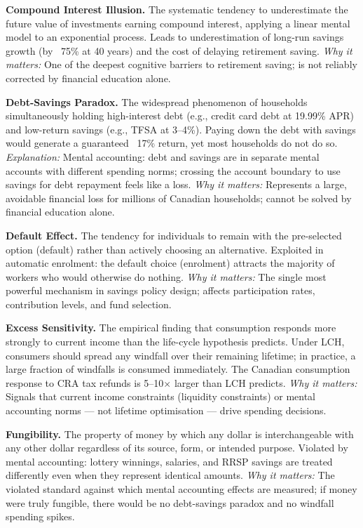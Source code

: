 \documentclass[12pt, letterpaper]{article}
\begin{document}
\textbf{Compound Interest Illusion.} The systematic tendency to underestimate the future value of investments earning compound interest, applying a linear mental model to an exponential process. Leads to underestimation of long-run savings growth (by ~75\% at 40 years) and the cost of delaying retirement saving. \textit{Why it matters:} One of the deepest cognitive barriers to retirement saving; is not reliably corrected by financial education alone.

\textbf{Debt-Savings Paradox.} The widespread phenomenon of households simultaneously holding high-interest debt (e.g., credit card debt at 19.99\% APR) and low-return savings (e.g., TFSA at 3--4\%). Paying down the debt with savings would generate a guaranteed ~17\% return, yet most households do not do so. \textit{Explanation:} Mental accounting: debt and savings are in separate mental accounts with different spending norms; crossing the account boundary to use savings for debt repayment feels like a loss. \textit{Why it matters:} Represents a large, avoidable financial loss for millions of Canadian households; cannot be solved by financial education alone.

\textbf{Default Effect.} The tendency for individuals to remain with the pre-selected option (default) rather than actively choosing an alternative. Exploited in automatic enrolment: the default choice (enrolment) attracts the majority of workers who would otherwise do nothing. \textit{Why it matters:} The single most powerful mechanism in savings policy design; affects participation rates, contribution levels, and fund selection.

\textbf{Excess Sensitivity.} The empirical finding that consumption responds more strongly to current income than the life-cycle hypothesis predicts. Under LCH, consumers should spread any windfall over their remaining lifetime; in practice, a large fraction of windfalls is consumed immediately. The Canadian consumption response to CRA tax refunds is 5--10$\times$ larger than LCH predicts. \textit{Why it matters:} Signals that current income constraints (liquidity constraints) or mental accounting norms --- not lifetime optimisation --- drive spending decisions.

\textbf{Fungibility.} The property of money by which any dollar is interchangeable with any other dollar regardless of its source, form, or intended purpose. Violated by mental accounting: lottery winnings, salaries, and RRSP savings are treated differently even when they represent identical amounts. \textit{Why it matters:} The violated standard against which mental accounting effects are measured; if money were truly fungible, there would be no debt-savings paradox and no windfall spending spikes.
\end{document}
